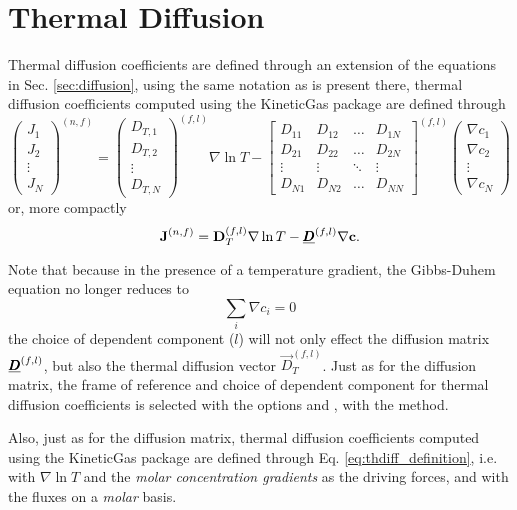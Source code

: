 \section{Thermal Diffusion}

Thermal diffusion coefficients are defined through an extension of the equations in Sec. \ref{sec:diffusion}, using the same notation as is present there, thermal diffusion coefficients computed using the KineticGas package are defined through
\begin{equation}
    \begin{pmatrix}J_1 \\ J_2 \\ \vdots \\ J_N \end{pmatrix}^{(n, f)} = 
    \begin{pmatrix}
    D_{T,1} \\ D_{T,2} \\ \vdots \\ D_{T,N}    
    \end{pmatrix}^{(f, l)} \nabla \ln T -
    \begin{bmatrix}
    D_{11} & D_{12} & \hdots & D_{1N} \\
    D_{21} & D_{22} & \hdots & D_{2N} \\
    \vdots & \vdots & \ddots & \vdots \\
    D_{N1} & D_{N2} & \hdots & D_{NN}
    \end{bmatrix}^{(f, l)}
    \begin{pmatrix}\nabla c_1 \\ \nabla c_2 \\ \vdots \\ \nabla c_N \end{pmatrix}
    \label{eq:thdiff_definition}
\end{equation}
or, more compactly
\begin{equation}
    \boldsymbol{\mathrm{J}}^{(n, f)} = \boldsymbol{\mathrm{D}}_T^{(f, l)} \nabla \ln T - \underline{\pmb{D}}^{(f, l)} \nabla \boldsymbol{\mathrm{c}}.
\end{equation}

Note that because in the presence of a temperature gradient, the Gibbs-Duhem equation no longer reduces to 
\begin{equation}
    \sum_i \nabla c_i = 0
\end{equation}
the choice of dependent component ($l$) will not only effect the diffusion matrix $\underline{\pmb{D}}^{(f, l)}$, but also the thermal diffusion vector $\Vec{D}_T^{(f, l)}$. Just as for the diffusion matrix, the frame of reference and choice of dependent component for thermal diffusion coefficients is selected with the options  and , with the  method. 

Also, just as for the diffusion matrix, thermal diffusion coefficients computed using the KineticGas package are defined through Eq. \eqref{eq:thdiff_definition}, i.e. with $\nabla \ln T$ and the \textit{molar concentration gradients} as the driving forces, and with the fluxes on a \textit{molar} basis.